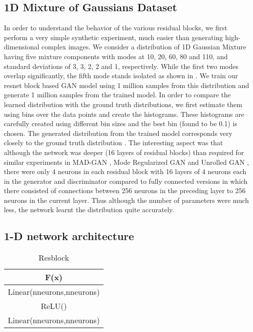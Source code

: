\subsection{1D Mixture of Gaussians Dataset}
In order to understand the behavior of the various residual blocks, we first perform a very simple synthetic experiment, much easier than generating high-dimensional complex images. We consider a distribution of 1D Gaussian Mixture \cite{bishop2007pattern} having five mixture components with modes at 10, 20, 60, 80 and 110, and standard deviations of 3, 3, 2, 2 and 1, respectively. While the first two modes overlap significantly, the fifth mode stands isolated as shown in . We train our resnet block based GAN model using 1 million samples from this distribution and generate 1 million samples from the trained model. In order to compare the learned distribution with the ground truth distributions, we first estimate them using bins over the data points and create the histograms. These histograms are carefully created using different bin sizes and the best bin (found to be 0.1) is chosen. The generated distribution from the trained model corresponds very closely to the ground truth distribution . The interesting aspect was that although the network was deeper (16 layers of residual blocks) than required for similar experiments in MAD-GAN \cite{ghosh2017multi}, Mode Regularized GAN \cite{che2016mode} and Unrolled GAN \cite{metz2017unrolledGAN}, there were only 4 neurons in each residual block with 16 layers of 4 neurons each in the generator and discriminator compared to fully connected versions in which there consisted of connections between 256 neurons in the preceding layer to 256 neurons in the current layer. Thus although the number of parameters were much less, the network learnt the distribution quite accurately.


\subsection{1-D network architecture}

\begin{table}[ht]
\caption{Resblock} %
\centering %
\begin{tabular}{c} %
\hline\hline %
F(x)\\%
\hline %
Linear(nneurons,nneurons)\\ %
ReLU() \\
Linear(nneurons,nneurons) \\
\hline %
\end{tabular}
\label{table:resblock} %
\end{table}


